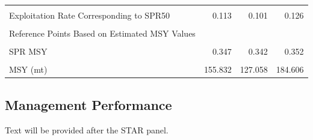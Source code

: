 \documentclass[11pt,
  english,
  a4paper,
]{article}
\begin{document}
\begin{table}[H]
\begin{tabular}[t]{lrrr}
\cellcolor{gray!6}{SPR50} & \cellcolor{gray!6}{0.500} & \cellcolor{gray!6}{} & \cellcolor{gray!6}{}\\
Exploitation Rate Corresponding to SPR50 & 0.113 & 0.101 & 0.126\\
\cellcolor{gray!6}{Yield with SPR50 at SB SPR (mt)} & \cellcolor{gray!6}{140.632} & \cellcolor{gray!6}{115.196} & \cellcolor{gray!6}{166.068}\\
\addlinespace
Reference Points Based on Estimated MSY Values &  &  & \\
\cellcolor{gray!6}{Spawning Output at MSY (SB MSY)} & \cellcolor{gray!6}{291.419} & \cellcolor{gray!6}{238.223} & \cellcolor{gray!6}{344.615}\\
SPR MSY & 0.347 & 0.342 & 0.352\\
\cellcolor{gray!6}{Exploitation Rate Corresponding to SPR MSY} & \cellcolor{gray!6}{0.177} & \cellcolor{gray!6}{0.158} & \cellcolor{gray!6}{0.195}\\
MSY (mt) & 155.832 & 127.058 & 184.606\\
\bottomrule
\end{tabular}
\end{table}


\hypertarget{management-performance}{%
\subsection*{Management Performance}\label{management-performance}}

\leavevmode\tagmcend\tagstructend

Text will be provided after the STAR panel.
\end{document}
